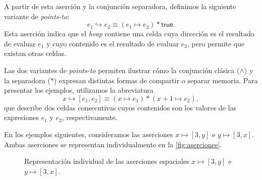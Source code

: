 \documentclass[a4paper,	11pt]{report}
\begin{document}
A partir de esta aserción y la conjunción separadora,
definimos la siguiente variante de \emph{points-to}:
$$e_1 \hookrightarrow e_2 \equiv (e_1 \mapsto e_2) * \mathsf{true}.$$
Esta aserción indica que el \emph{heap} contiene una celda cuya dirección es
el resultado de evaluar $e_1$ y cuyo contenido es el resultado de evaluar $e_2$,
pero permite que existan otras celdas.

Las dos variantes de \emph{points-to} permiten ilustrar cómo la conjunción clásica ($\land$) y la separadora ($*$)
expresan distintas formas de compartir o separar memoria.
Para presentar los ejemplos,
utilizamos la abreviatura 
$$x \mapsto [e_1, e_2] \equiv (x \mapsto e_1) * (x + 1 \mapsto e_2),$$
que describe dos celdas consecutivas cuyos contenidos son los valores de las expresiones $e_1$ y $e_2$,
respectivamente.

En los ejemplos siguientes,
consideramos las aserciones $x \mapsto [3, y]$ e $y \mapsto [3, x]$.
Ambas aserciones se representan individualmente en la \autoref{fig:aserciones}.

\begin{figure}[h]
  \centering
  \begin{minipage}{0.45\textwidth}
    \centering
  \end{minipage}
  \hfill
  \begin{minipage}{0.45\textwidth}
    \centering
  \end{minipage}
\caption{Representación individual de las aserciones espaciales $x \mapsto [3, y]$ e $y \mapsto [3, x]$.}
\label{fig:aserciones}
\end{figure}
\end{document}
